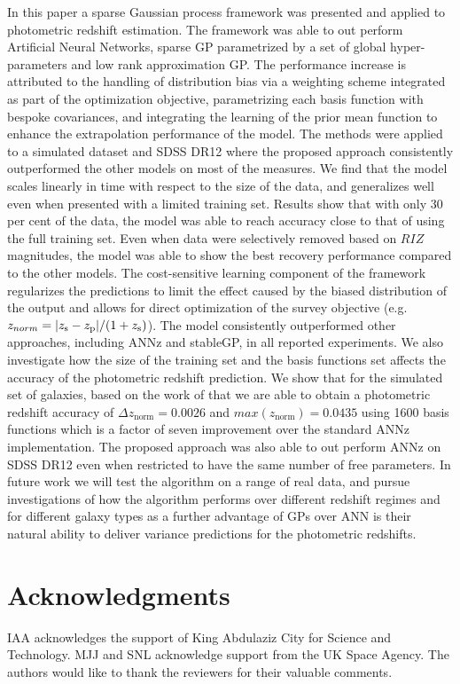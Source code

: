 \documentclass[useAMS,usenatbib,fleqn]{mn2e}
\begin{document}
In this paper a sparse Gaussian process framework was presented and applied to photometric redshift estimation. The framework was able to out perform Artificial Neural Networks, sparse GP parametrized by a set of global hyper-parameters and low rank approximation GP. The performance increase is attributed to the handling of distribution bias via a weighting scheme integrated as part of the optimization objective, parametrizing each basis function with bespoke covariances, and integrating the learning of the prior mean function to enhance the extrapolation performance of the model. The methods were applied to a simulated dataset and SDSS DR12 where the proposed approach consistently outperformed the other models on most of the measures. We find that the model scales linearly in time with respect to the size of the data, and generalizes well even when presented with a limited training set. Results show that with only 30 per cent of the data, the model was able to reach accuracy close to that of using the full training set. Even when data were selectively removed based on $RIZ$ magnitudes, the model was able to show the best recovery performance compared to the other models. The cost-sensitive learning component of the framework regularizes the predictions to limit the effect caused by the biased distribution of the output and allows for direct optimization of the survey objective (e.g. $z_{norm} = |z_\textrm{s} - z_\textrm{p}| / (1+z_{\rm s})$). The model consistently outperformed other approaches, including {\sc ANNz} and {\sc stableGP}, in all reported experiments. We also investigate how the size of the training set and the basis functions set affects the accuracy of the photometric redshift prediction. We show that for the simulated set of galaxies, based on the work of \citet{jouvel09} that we are able to obtain a photometric redshift accuracy of $\Delta z_\textrm{norm}  = 0.0026$ and $max\left(z_\textrm{norm}\right)=0.0435$ using 1600 basis functions which is a factor of seven improvement over the standard {\sc ANNz} implementation. The proposed approach was also able to out perform {\sc ANNz} on SDSS DR12 even when restricted to have the same number of free parameters. In future work we will test the algorithm on a range of real data, and pursue investigations of how the algorithm performs over different redshift regimes and for different galaxy types as a further advantage of GPs over ANN is their natural ability to deliver variance predictions for the photometric redshifts.




\section*{Acknowledgments}
IAA acknowledges the support of King Abdulaziz City for Science and Technology.
MJJ and SNL acknowledge support from the UK Space Agency. The authors would like to thank the reviewers for their valuable comments.
\balance
\footnotesize{


}

\label{lastpage}
\end{document}
